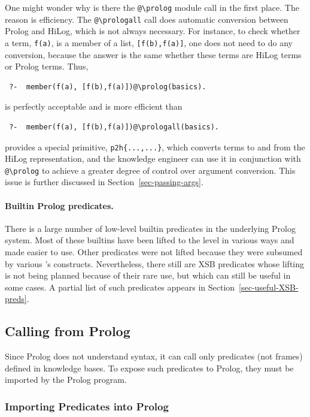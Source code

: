 \documentclass[11pt]{article}
\newcommand{\ERGO}{\mbox{\smaller{\ensuremath{\cal{E}}\smaller{{\sc{RGO}}}}}\xspace}
\newcommand{\FLSYSTEM}{\ERGO}
\newcommand{\bs}{\textbackslash}
\begin{document}
One might wonder why is there the {\tt @\bs{}prolog} module call in the first
place. The reason is efficiency. The {\tt @\bs{}prologall} call does automatic
conversion between Prolog and HiLog, which is not always necessary. For
instance, to check whether a term, {\tt f(a)}, is a member of a list,
{\tt [f(b),f(a)]}, one does not need to do any conversion, because the
answer is the same whether these terms are HiLog terms or Prolog
terms. Thus,
\begin{verbatim}
 ?-  member(f(a), [f(b),f(a)])@\prolog(basics).
\end{verbatim}
is perfectly acceptable and is more efficient than
\begin{verbatim}
 ?-  member(f(a), [f(b),f(a)])@\prologall(basics).
\end{verbatim}
\FLSYSTEM provides a special primitive, {\tt p2h\{...,...\}}, which converts terms to
and from the HiLog representation, and the knowledge engineer can use it in
conjunction with {\tt @\bs{}prolog} to achieve a greater degree of control
over argument conversion. This issue is further discussed in
Section~\ref{sec-passing-args}.

\paragraph{Builtin Prolog predicates.}
There is a large number of low-level builtin predicates in the
underlying Prolog system. Most of these builtins
have been lifted to the \FLSYSTEM
level in various ways and made easier to use. Other predicates
were not lifted because they were subsumed by various
\FLSYSTEM's constructs. Nevertheless, there still are XSB predicates whose
lifting is not being planned because of their rare
use, but which can still be useful in some cases.
A partial list of such predicates appears in Section~\ref{sec-useful-XSB-preds}.


\subsection{Calling \FLSYSTEM from Prolog}\label{sec-flora-from-prolog}

Since Prolog does not understand \FLSYSTEM syntax, it can call only
predicates (not frames) defined in \FLSYSTEM knowledge bases. To expose such
predicates to Prolog,
they must be imported by the Prolog program.

\subsubsection{Importing \FLSYSTEM Predicates into Prolog}
\end{document}
